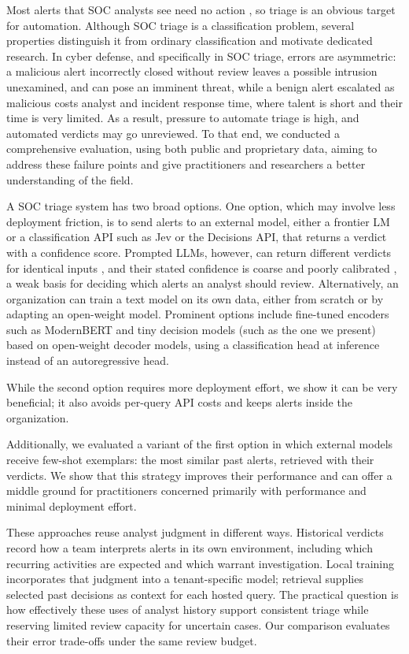 \documentclass[letterpaper]{article} %
\begin{document}
Most alerts that SOC analysts see need no action \citep{alahmadi2022falsepositives}, so triage is an obvious target for automation. Although SOC triage is a classification problem, several properties distinguish it from ordinary classification and motivate dedicated research. In cyber defense, and specifically in SOC triage, errors are asymmetric: a malicious alert incorrectly closed without review leaves a possible intrusion unexamined, and can pose an imminent threat, while a benign alert escalated as malicious costs analyst and incident response time, where talent is short and their time is very limited. As a result, pressure to automate triage is high, and automated verdicts may go unreviewed. To that end, we conducted a comprehensive evaluation, using both public and proprietary data, aiming to address these failure points and give practitioners and researchers a better understanding of the field. 

A SOC triage system has two broad options. One option, which may involve less deployment friction, is to send alerts to an external model, either a frontier LM or a classification API such as Jev or the Decisions API, that returns a verdict with a confidence score. Prompted LLMs, however, can return different verdicts for identical inputs \citep{atil2024nondeterminism}, and their stated confidence is coarse and poorly calibrated \citep{xiong2024uncertainty}, a weak basis for deciding which alerts an analyst should review. Alternatively, an organization can train a text model on its own data, either from scratch or by adapting an open-weight model. Prominent options include fine-tuned encoders such as ModernBERT \citep{warner2024modernbert} and tiny decision models (such as the one we present) based on open-weight decoder models, using a classification head at inference instead of an autoregressive head. 

While the second option requires more deployment effort, we show it can be very beneficial; it also avoids per-query API costs and keeps alerts inside the organization.

Additionally, we evaluated a variant of the first option in which external models receive few-shot exemplars: the most similar past alerts, retrieved with their verdicts. We show that this strategy improves their performance and can offer a middle ground for practitioners concerned primarily with performance and minimal deployment effort.

These approaches reuse analyst judgment in different ways. Historical verdicts record how a team interprets alerts in its own environment, including which recurring activities are expected and which warrant investigation. Local training incorporates that judgment into a tenant-specific model; retrieval supplies selected past decisions as context for each hosted query. The practical question is how effectively these uses of analyst history support consistent triage while reserving limited review capacity for uncertain cases. Our comparison evaluates their error trade-offs under the same review budget.
\end{document}
